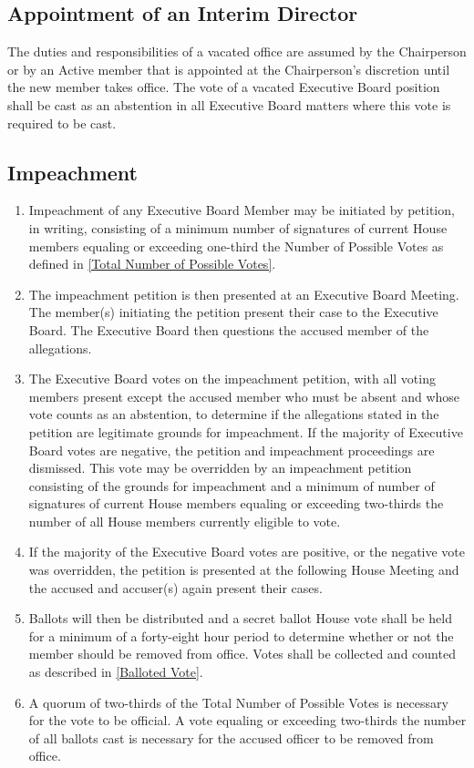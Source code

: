 \documentclass{article}
\newcommand{\asection}[1]{\subsection{#1} \label{#1}}
\begin{document}
\asection{Appointment of an Interim Director}
The duties and responsibilities of a vacated office are assumed by the Chairperson or by an Active member that is appointed at the Chairperson's discretion until the new member takes office.
The vote of a vacated Executive Board position shall be cast as an abstention in all Executive Board matters where this vote is required to be cast.

\asection{Impeachment}
\begin{enumerate}
	\item Impeachment of any Executive Board Member may be initiated by petition, in writing, consisting of a minimum number of signatures of current House members equaling or exceeding one-third the Number of Possible Votes as defined in \ref{Total Number of Possible Votes}.
	\item The impeachment petition is then presented at an Executive Board Meeting.
		The member(s) initiating the petition present their case to the Executive Board.
		The Executive Board then questions the accused member of the allegations.
	\item The Executive Board votes on the impeachment petition, with all voting members present except the accused member who must be absent and whose vote counts as an abstention, to determine if the allegations stated in the petition are legitimate grounds for impeachment.
		If the majority of Executive Board votes are negative, the petition and impeachment proceedings are dismissed.
		This vote may be overridden by an impeachment petition consisting of the grounds for impeachment and a minimum of number of signatures of current House members equaling or exceeding two-thirds the number of all House members currently eligible to vote.
	\item If the majority of the Executive Board votes are positive, or the negative vote was overridden, the petition is presented at the following House Meeting and the accused and accuser(s) again present their cases.
	\item Ballots will then be distributed and a secret ballot House vote shall be held for a minimum of a forty-eight hour period to determine whether or not the member should be removed from office.
		Votes shall be collected and counted as described in \ref{Balloted Vote}.
	\item A quorum of two-thirds of the Total Number of Possible Votes is necessary for the vote to be official.
		A vote equaling or exceeding two-thirds the number of all ballots cast is necessary for the accused officer to be removed from office.

\end{enumerate}
\end{document}
